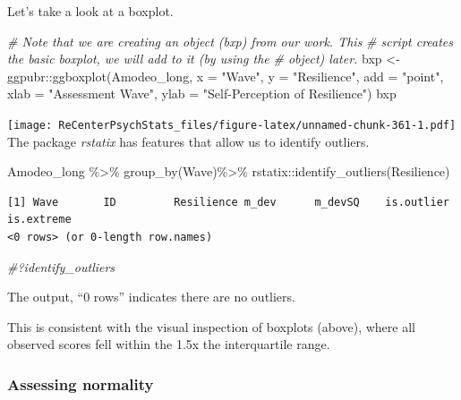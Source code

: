 \documentclass[
  11pt,
]{book}
\newenvironment{Shaded}{\begin{snugshade}}{\end{snugshade}}
\newcommand{\AttributeTok}[1]{\textcolor[rgb]{0.77,0.63,0.00}{#1}}
\newcommand{\CommentTok}[1]{\textcolor[rgb]{0.56,0.35,0.01}{\textit{#1}}}
\newcommand{\FunctionTok}[1]{\textcolor[rgb]{0.00,0.00,0.00}{#1}}
\newcommand{\NormalTok}[1]{#1}
\newcommand{\OtherTok}[1]{\textcolor[rgb]{0.56,0.35,0.01}{#1}}
\newcommand{\SpecialCharTok}[1]{\textcolor[rgb]{0.00,0.00,0.00}{#1}}
\newcommand{\StringTok}[1]{\textcolor[rgb]{0.31,0.60,0.02}{#1}}
\begin{document}
Let's take a look at a boxplot.

\begin{Shaded}
\begin{Highlighting}[]
\CommentTok{\# Note that we are creating an object (bxp) from our work.  This}
\CommentTok{\# script creates the basic boxplot, we will add to it (by using the}
\CommentTok{\# object) later.}
\NormalTok{bxp }\OtherTok{\textless{}{-}}\NormalTok{ ggpubr}\SpecialCharTok{::}\FunctionTok{ggboxplot}\NormalTok{(Amodeo\_long, }\AttributeTok{x =} \StringTok{"Wave"}\NormalTok{, }\AttributeTok{y =} \StringTok{"Resilience"}\NormalTok{, }\AttributeTok{add =} \StringTok{"point"}\NormalTok{,}
    \AttributeTok{xlab =} \StringTok{"Assessment Wave"}\NormalTok{, }\AttributeTok{ylab =} \StringTok{"Self{-}Perception of Resilience"}\NormalTok{)}
\NormalTok{bxp}
\end{Highlighting}
\end{Shaded}

\texttt{[image: ReCenterPsychStats\_files/figure-latex/unnamed-chunk-361-1.pdf]}
The package \emph{rstatix} has features that allow us to identify outliers.

\begin{Shaded}
\begin{Highlighting}[]
\NormalTok{Amodeo\_long }\SpecialCharTok{\%\textgreater{}\%}
  \FunctionTok{group\_by}\NormalTok{(Wave)}\SpecialCharTok{\%\textgreater{}\%}
\NormalTok{  rstatix}\SpecialCharTok{::}\FunctionTok{identify\_outliers}\NormalTok{(Resilience)}
\end{Highlighting}
\end{Shaded}

\begin{verbatim}
[1] Wave       ID         Resilience m_dev      m_devSQ    is.outlier is.extreme
<0 rows> (or 0-length row.names)
\end{verbatim}

\begin{Shaded}
\begin{Highlighting}[]
\CommentTok{\#?identify\_outliers}
\end{Highlighting}
\end{Shaded}

The output, ``0 rows'' indicates there are no outliers.

This is consistent with the visual inspection of boxplots (above), where all observed scores fell within the 1.5x the interquartile range.

\hypertarget{assessing-normality}{%
\subsubsection{Assessing normality}\label{assessing-normality}}
\end{document}
